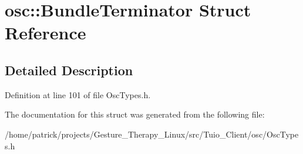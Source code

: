 \hypertarget{structosc_1_1_bundle_terminator}{}\section{osc\+:\+:Bundle\+Terminator Struct Reference}
\label{structosc_1_1_bundle_terminator}


\subsection{Detailed Description}


Definition at line 101 of file Osc\+Types.\+h.



The documentation for this struct was generated from the following file\+:\begin{DoxyCompactItemize}
\item 
/home/patrick/projects/\+Gesture\+\_\+\+Therapy\+\_\+\+Linux/src/\+Tuio\+\_\+\+Client/osc/Osc\+Types.\+h\end{DoxyCompactItemize}
